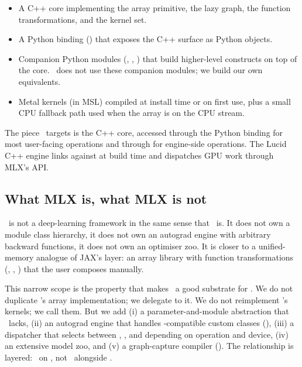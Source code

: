 \begin{itemize}
  \item A C++ core implementing the array primitive, the lazy graph,
    the function transformations, and the kernel set.
  \item A Python binding () that exposes the C++
    surface as Python objects.
  \item Companion Python modules (, ,
    ) that build higher-level constructs on top of
    the core. \Lucid\ does not use these companion modules; we build
    our own equivalents.
  \item Metal kernels (in MSL) compiled at install time or on first
    use, plus a small CPU fallback path used when the array is on
    the CPU stream.
\end{itemize}

The piece \Lucid\ targets is the C++ core, accessed through the
Python binding for most user-facing operations and through
 for engine-side
operations. The Lucid C++ engine links against 
at build time and dispatches GPU work through MLX's API.

\subsection{What MLX is, what MLX is not}
\label{ssec:mlx_runtime:what_is}

\MLX\ is not a deep-learning framework in the same sense that
\ is. It does not own a module class hierarchy, it does
not own an autograd engine with arbitrary backward functions, it
does not own an optimiser zoo. It is closer to a unified-memory
analogue of JAX's  layer: an array library with
function transformations (, , ) that
the user composes manually.

This narrow scope is the property that makes \MLX\ a good substrate
for \Lucid. We do not duplicate \MLX's array implementation; we
delegate to it. We do not reimplement \MLX's kernels; we call them.
But we add (i) a parameter-and-module abstraction that \MLX\ lacks,
(ii) an autograd engine that handles -compatible custom
 classes (), (iii) a
dispatcher that selects between \MLX, \Accelerate, and \MPSGraph
depending on operation and device, (iv) an extensive model zoo, and
(v) a graph-capture compiler (). The
relationship is layered: \Lucid\ on \MLX, not \Lucid\ alongside
\MLX.

